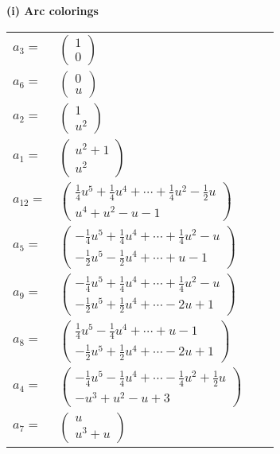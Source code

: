 \documentclass[1p]{elsarticle_modified}
\theoremstyle{definition}
\begin{document}
\flushleft \textbf{(i) Arc colorings}\\
\begin{tabular}{m{7pt} m{180pt} m{7pt} m{180pt} }
\flushright $a_{3}=$&$\begin{pmatrix}1\\0\end{pmatrix}$ \\
\flushright $a_{6}=$&$\begin{pmatrix}0\\u\end{pmatrix}$ \\
\flushright $a_{2}=$&$\begin{pmatrix}1\\u^2\end{pmatrix}$ \\
\flushright $a_{1}=$&$\begin{pmatrix}u^2+1\\u^2\end{pmatrix}$ \\
\flushright $a_{12}=$&$\begin{pmatrix}\frac{1}{4} u^5+\frac{1}{4} u^4+\cdots+\frac{1}{4} u^2-\frac{1}{2} u\\u^4+u^2- u-1\end{pmatrix}$ \\
\flushright $a_{5}=$&$\begin{pmatrix}-\frac{1}{4} u^5+\frac{1}{4} u^4+\cdots+\frac{1}{4} u^2- u\\-\frac{1}{2} u^5-\frac{1}{2} u^4+\cdots+u-1\end{pmatrix}$ \\
\flushright $a_{9}=$&$\begin{pmatrix}-\frac{1}{4} u^5+\frac{1}{4} u^4+\cdots+\frac{1}{4} u^2- u\\-\frac{1}{2} u^5+\frac{1}{2} u^4+\cdots-2 u+1\end{pmatrix}$ \\
\flushright $a_{8}=$&$\begin{pmatrix}\frac{1}{4} u^5-\frac{1}{4} u^4+\cdots+u-1\\-\frac{1}{2} u^5+\frac{1}{2} u^4+\cdots-2 u+1\end{pmatrix}$ \\
\flushright $a_{4}=$&$\begin{pmatrix}-\frac{1}{4} u^5-\frac{1}{4} u^4+\cdots-\frac{1}{4} u^2+\frac{1}{2} u\\- u^3+u^2- u+3\end{pmatrix}$ \\
\flushright $a_{7}=$&$\begin{pmatrix}u\\u^3+u\end{pmatrix}$ \\

\end{tabular}
\end{document}
